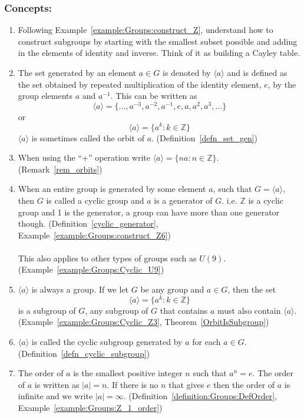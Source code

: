 \subsubsection*{Concepts:}
\begin{enumerate}
\item 
Following Example~\ref{example:Groups:construct_Z}, understand how to construct subgroups by starting with the smallest subset possible and adding in the elements of identity and inverse.  Think of it as building a Cayley table.

\item
The set generated by an element $a \in G$ is denoted by $\langle a \rangle$ and is defined as the set obtained by repeated multiplication of the identity element, $e$, by the group elements $a$ and $a^{-1}$.  This can be written as  \[ \langle a \rangle = \{ \ldots, a^{-3}, a^{-2}, a^{-1}, e, a, a^2, a^3, \ldots \} \] or \[ \langle a \rangle = \{ a^{k} : k \in \mathbb Z \} \] $\langle a \rangle$ is sometimes called the orbit of $a$. (Definition~\ref{defn_set_gen})

\item
When using the ``+'' operation write $\langle a \rangle  = \{ na : n \in {\mathbb Z} \}$. (Remark~\ref{rem_orbits})

\item
When an entire group is generated by some element $a$, such that $G = \langle a \rangle$, then $G$ is called a cyclic group and $a$ is a generator of $G$. i.e. ${\mathbb Z}$ is a cyclic group and 1 is the generator, a group can have more than one generator though. (Definition~\ref{cyclic_generator}, Example~\ref{example:Groups:construct_Z6})
\\
\\
This also applies to other types of groups such as $U(9)$. (Example~\ref{example:Groups:Cyclic_U9})

\item
$\langle a \rangle$ is always a group. If we let $G$ be any group and $a \in G$, then the set \[\langle a \rangle  = \{ a^k : k \in {\mathbb Z}\}\] is a subgroup of $G$, any subgroup of $G$ that contains $a$ must also contain $\langle a \rangle$. (Example~\ref{example:Groups:Cyclic_Z3}, Theorem~\ref{OrbitIsSubgroup})

\item
$\langle a \rangle$ is called the cyclic subgroup generated by $a$ for each $a \in G$. (Definition~\ref{defn_cyclic_subgroup})

\item
The order of $a$ is the smallest positive integer $n$ such that $a^n = e$. The order of $a$ is written as $|a| = n$. If there is no $n$ that gives $e$ then the order of $a$ is infinite and we write $|a| = \infty$. (Definition~\ref{definition:Groups:DefOrder}, Example~\ref{example:Groups:Z_1_order})


\end{enumerate}
